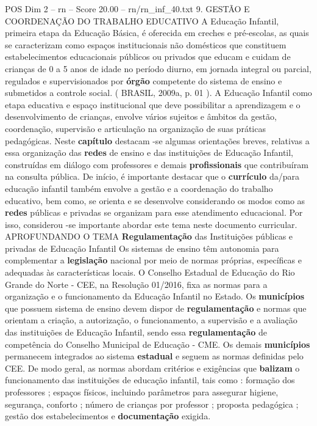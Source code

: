 \begin{textsample}{POS Dim 2 – rn – Score 20.00 – rn/rn\_inf\_40.txt}  \label{ex:f2_pos_248}
9.
GESTÃO E COORDENAÇÃO DO TRABALHO EDUCATIVO A Educação Infantil, primeira etapa da Educação Básica, é oferecida em creches e pré-escolas, as quais se caracterizam como espaços institucionais não domésticos que constituem estabelecimentos educacionais públicos ou privados que educam e cuidam de crianças de 0 a 5 anos de idade no período diurno, em jornada integral ou parcial, regulados e supervisionados por \textbf{órgão} competente do sistema de ensino e submetidos a controle social. ( BRASIL, 2009a, p. 01 ).
A Educação Infantil como etapa educativa e espaço institucional que deve possibilitar a aprendizagem e o desenvolvimento de crianças, envolve vários sujeitos e âmbitos da gestão, coordenação, supervisão e articulação na organização de suas práticas pedagógicas.
Neste \textbf{capítulo} destacam -se algumas orientações breves, relativas a essa organização das \textbf{redes} de ensino e das instituições de Educação Infantil, construídas em diálogo com professores e demais \textbf{profissionais} que contribuíram na consulta pública.
De início, é importante destacar que o \textbf{currículo} da/para educação infantil também envolve a gestão e a coordenação do trabalho educativo, bem como, se orienta e se desenvolve considerando os modos como as \textbf{redes} públicas e privadas se organizam para esse atendimento educacional.
Por isso, considerou -se importante abordar este tema neste documento curricular.
APROFUNDANDO O TEMA \textbf{Regulamentação} das Instituições públicas e privadas de Educação Infantil Os sistemas de ensino têm autonomia para complementar a \textbf{legislação} nacional por meio de normas próprias, específicas e adequadas às características locais.
O Conselho Estadual de Educação do Rio Grande do Norte - CEE, na Resolução 01/2016, fixa as normas para a organização e o funcionamento da Educação Infantil no Estado.
Os \textbf{municípios} que possuem sistema de ensino devem dispor de \textbf{regulamentação} e normas que orientam a criação, a autorização, o funcionamento, a supervisão e a avaliação das instituições de Educação Infantil, sendo essa \textbf{regulamentação} de competência do Conselho Municipal de Educação - CME.
Os demais \textbf{municípios} permanecem integrados ao sistema \textbf{estadual} e seguem as normas definidas pelo CEE.
De modo geral, as normas abordam critérios e exigências que \textbf{balizam} o funcionamento das instituições de educação infantil, tais como : formação dos professores ; espaços físicos, incluindo parâmetros para assegurar higiene, segurança, conforto ; número de crianças por professor ; proposta pedagógica ; gestão dos estabelecimentos e \textbf{documentação} exigida.

\end{textsample}

